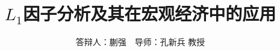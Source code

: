 \documentclass{beamer}
\begin{document}
\title{$L_1$因子分析及其在宏观经济中的应用} 
\author{答辩人：蒯强\ \ 导师：孔新兵 教授}

\frame{\titlepage}










\end{document}

